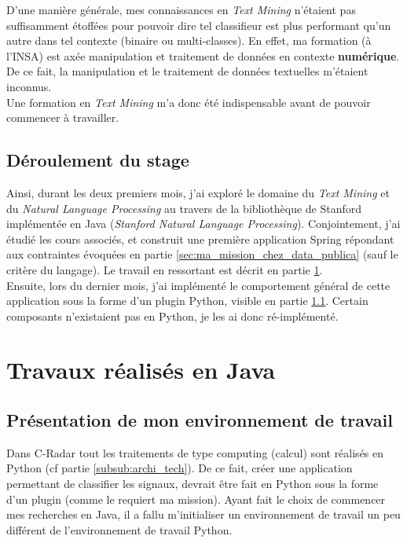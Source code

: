         D'une manière générale, mes connaissances en \textit{Text Mining} n'étaient pas suffisamment étoffées pour pouvoir dire tel classifieur est plus performant qu'un autre dans tel contexte (binaire ou multi-classes). En effet, ma formation (à l'INSA) est axée manipulation et traitement de données en contexte \textbf{numérique}. De ce fait, la manipulation et le traitement de données textuelles m'étaient inconnus.\\

        Une formation en \textit{Text Mining} m'a donc été indispensable avant de pouvoir commencer à travailler.

    \subsection{Déroulement du stage}
        Ainsi, durant les deux premiers mois, j'ai exploré le domaine du \textit{Text Mining} et du \textit{Natural Language Processing} au travers de la bibliothèque de Stanford implémentée en Java (\textit{Stanford Natural Language Processing}). Conjointement, j'ai étudié les cours associés, et construit une première application Spring répondant aux contraintes évoquées en partie \ref{sec:ma_mission_chez_data_publica} (sauf le critère du langage). Le travail en ressortant est décrit en partie \ref{sec:travaux_realises_en_java}.\\

        Ensuite, lors du dernier mois, j’ai implémenté le comportement général de cette application sous la forme d’un plugin Python, visible en partie \ref{}. Certain composants n'existaient pas en Python, je les ai donc ré-implémenté.

\section{Travaux réalisés en Java}
\label{sec:travaux_realises_en_java}
    \subsection{Présentation de mon environnement de travail}
        Dans C-Radar tout les traitements de type \og computing \fg (calcul) sont réalisés en Python (cf partie \ref{subsub:archi_tech}). De ce fait, créer une application permettant de classifier les signaux, devrait être fait en Python sous la forme d'un plugin (comme le requiert ma mission). Ayant fait le choix de commencer mes recherches en Java, il a fallu m'initialiser un environnement de travail un peu différent de l'environnement de travail Python.\\

